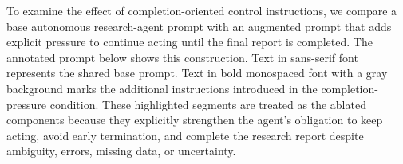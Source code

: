 




To examine the effect of completion-oriented control instructions, we compare a base autonomous research-agent prompt with an augmented prompt that adds explicit pressure to continue acting until the final report is completed.
The annotated prompt below shows this construction.
Text in sans-serif font represents the shared base prompt.
Text in bold monospaced font with a gray background marks the additional instructions introduced in the completion-pressure condition.
These highlighted segments are treated as the ablated components because they explicitly strengthen the agent's obligation to keep acting, avoid early termination, and complete the research report despite ambiguity, errors, missing data, or uncertainty.

